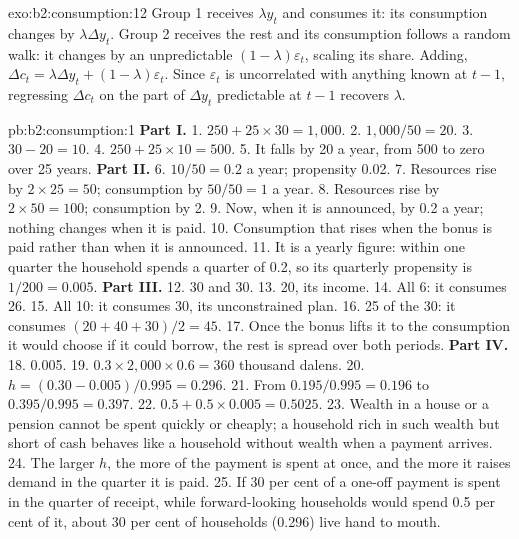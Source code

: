 \begin{solution}{exo:b2:consumption:12}
Group 1 receives $\lambda y_t$ and consumes it: its consumption changes by $\lambda\Delta y_t$. Group 2 receives the rest and its consumption follows a random
walk: it changes by an unpredictable $(1 - \lambda)\varepsilon_t$, scaling its share. Adding, $\Delta c_t = \lambda\Delta y_t + (1 - \lambda)\varepsilon_t$. Since $\varepsilon_t$ is uncorrelated with anything
known at $t - 1$, regressing $\Delta c_t$ on the part of $\Delta y_t$ predictable at $t - 1$ recovers $\lambda$.
\end{solution}

\begin{solution}{pb:b2:consumption:1}
\textbf{Part I.}
1. $250 + 25 \times 30 = 1{,}000$.
2. $1{,}000/50 = 20$.
3. $30 - 20 = 10$.
4. $250 + 25 \times 10 = 500$.
5. It falls by 20 a year, from 500 to zero over 25 years.
\textbf{Part II.}
6. $10/50 = 0.2$ a year; propensity 0.02.
7. Resources rise by $2 \times 25 = 50$; consumption by $50/50 = 1$ a year.
8. Resources rise by $2 \times 50 = 100$; consumption by 2.
9. Now, when it is announced, by 0.2 a year; nothing changes when it is paid.
10. Consumption that rises when the bonus is paid rather than when it is announced.
11. It is a yearly figure: within one quarter the household spends a quarter of 0.2, so its quarterly propensity is $1/200 = 0.005$.
\textbf{Part III.}
12. 30 and 30.
13. 20, its income.
14. All 6: it consumes 26.
15. All 10: it consumes 30, its unconstrained plan.
16. 25 of the 30: it consumes $(20 + 40 + 30)/2 = 45$.
17. Once the bonus lifts it to the consumption it would choose if it could borrow, the rest is spread over both periods.
\textbf{Part IV.}
18. 0.005.
19. $0.3 \times 2{,}000 \times 0.6 = 360$ thousand dalens.
20. $h = (0.30 - 0.005)/0.995 = 0.296$.
21. From $0.195/0.995 = 0.196$ to $0.395/0.995 = 0.397$.
22. $0.5 + 0.5 \times 0.005 = 0.5025$.
23. Wealth in a house or a pension cannot be spent quickly or cheaply; a household rich in such wealth but short of cash
behaves like a household without wealth when a payment arrives.
24. The larger $h$, the more of the payment is spent at once, and the more it raises demand in the quarter it is paid.
25. If 30 per cent of a one-off payment is spent in the quarter of receipt, while forward-looking households would spend
0.5 per cent of it, about 30 per cent of households (0.296) live hand to mouth.
\end{solution}
